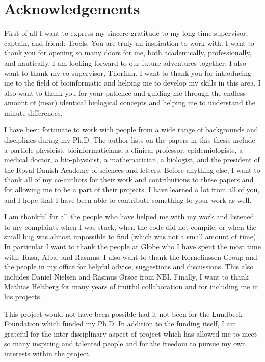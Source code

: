 \chapter{Acknowledgements}

First of all I want to express my sincere gratitude to my long time supervisor, captain, and friend: Troels. You are truly an inspiration to work with. I want to thank you for opening so many doors for me, both academically, professionally, and nautically. I am looking forward to our future adventures together.
I also want to thank my co-supervisor, Thorfinn. I want to thank you for introducing me to the field of bioinformatic and helping me to develop my skills in this area. I also want to thank you for your patience and guiding me through the endless amount of (near) identical biological concepts and helping me to understand the minute differences.

I have been fortunate to work with people from a wide range of backgrounds and disciplines during my Ph.D. The author lists on the papers in this thesis include a particle physicist, bioinformaticians, a clinical professor, epidemiologists, a medical doctor, a bio-physicist, a mathematician, a biologist, and the president of the Royal Danish Academy of sciences and letters. Before anything else, I want to thank all of my co-authors for their work and contributions to these papers and for allowing me to be a part of their projects. I have learned a lot from all of you, and I hope that I have been able to contribute something to your work as well.

I am thankful for all the people who have helped me with my work and listened to my complaints when I was stuck, when the code did not compile, or when the small bug was almost impossible to find (which was not a small amount of time). In particular I want to thank the people at Globe who I have spent the most time with; Rasa, Alba, and Rasmus. I also want to thank the Korneliussen Group and the people in my office for helpful advice, suggestions and discussions. This also includes Daniel Nielsen and Rasmus Ørsøe from NBI. Finally, I want to thank Mathias Heltberg for many years of fruitful collaboration and for including me in his projects.

This project would not have been possible had it not been for the Lundbeck Foundation which funded my Ph.D. In addition to the funding itself, I am grateful for the inter-disciplinary aspect of project which has allowed me to meet so many inspiring and talented people and  for the freedom to pursue my own interests within the project.


